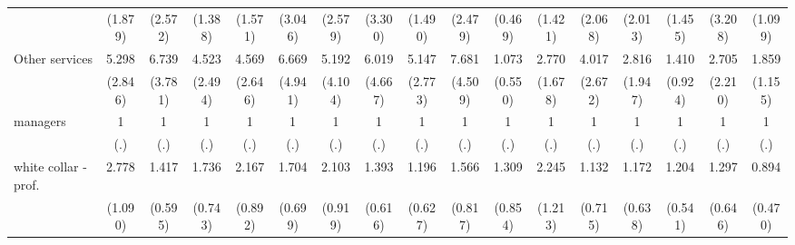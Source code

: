 {\begin{tabular}{l*{16}{c}}
                    &     (1.879)         &     (2.572)         &     (1.388)         &     (1.571)         &     (3.046)         &     (2.579)         &     (3.300)         &     (1.490)         &     (2.479)         &     (0.469)         &     (1.421)         &     (2.068)         &     (2.013)         &     (1.455)         &     (3.208)         &     (1.099)         \\
[1em]
Other services      &       5.298\sym{**} &       6.739\sym{***}&       4.523\sym{**} &       4.569\sym{**} &       6.669\sym{*}  &       5.192\sym{*}  &       6.019\sym{*}  &       5.147\sym{**} &       7.681\sym{***}&       1.073         &       2.770         &       4.017\sym{*}  &       2.816         &       1.410         &       2.705         &       1.859         \\
                    &     (2.846)         &     (3.781)         &     (2.494)         &     (2.646)         &     (4.941)         &     (4.104)         &     (4.667)         &     (2.773)         &     (4.509)         &     (0.550)         &     (1.678)         &     (2.672)         &     (1.947)         &     (0.924)         &     (2.210)         &     (1.155)         \\
[1em]
managers            &           1         &           1         &           1         &           1         &           1         &           1         &           1         &           1         &           1         &           1         &           1         &           1         &           1         &           1         &           1         &           1         \\
                    &         (.)         &         (.)         &         (.)         &         (.)         &         (.)         &         (.)         &         (.)         &         (.)         &         (.)         &         (.)         &         (.)         &         (.)         &         (.)         &         (.)         &         (.)         &         (.)         \\
[1em]
white collar - prof.&       2.778\sym{**} &       1.417         &       1.736         &       2.167         &       1.704         &       2.103         &       1.393         &       1.196         &       1.566         &       1.309         &       2.245         &       1.132         &       1.172         &       1.204         &       1.297         &       0.894         \\
                    &     (1.090)         &     (0.595)         &     (0.743)         &     (0.892)         &     (0.699)         &     (0.919)         &     (0.616)         &     (0.627)         &     (0.817)         &     (0.854)         &     (1.213)         &     (0.715)         &     (0.638)         &     (0.541)         &     (0.646)         &     (0.470)         \\

\end{tabular}}

